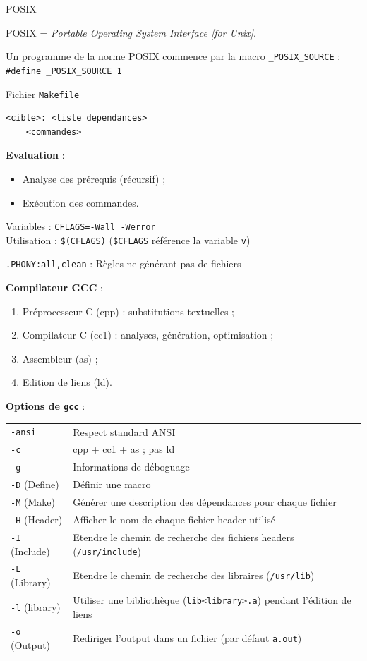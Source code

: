 \documentclass[french]{scrartcl}
\begin{document}
\begin{multicols}{3}
{\Large POSIX}

\vskip 15pt
POSIX = \emph{Portable Operating System Interface [for Unix]}.

Un programme de la norme POSIX commence par la macro \lstinline!_POSIX_SOURCE! : \lstinline!#define _POSIX_SOURCE 1!


\vskip 10pt
Fichier \lstinline!Makefile!
\vspace{-7pt}\begin{lstlisting}
<cible>: <liste dependances>
	<commandes>
\end{lstlisting}\vspace{-7pt}
\textbf{Evaluation} :\begin{itemize}
	\item Analyse des prérequis (récursif) ;
	\item Exécution des commandes.
\end{itemize}
Variables : \lstinline!CFLAGS=-Wall -Werror!\\
Utilisation : \lstinline!$(CFLAGS)! (\lstinline!$CFLAGS! référence la variable \lstinline!v!)

\lstinline!.PHONY:all,clean! : Règles ne générant pas de fichiers

\textbf{Compilateur GCC} :\begin{enumerate}
	\item Préprocesseur C (cpp) : substitutions textuelles ;
	\item Compilateur C (cc1) : analyses, génération, optimisation ;
	\item Assembleur (as) ;
	\item Edition de liens (ld).
\end{enumerate}  

\textbf{Options de \lstinline!gcc!} :

\begin{tabularx}{\linewidth}{lX}
\lstinline!-ansi! & Respect standard ANSI\\
\lstinline!-c! & cpp + cc1 + as ; pas ld\\
\lstinline!-g! & Informations de déboguage\\
\lstinline!-D! (Define) & Définir une macro\\
\lstinline!-M! (Make) & Générer une description des dépendances pour chaque fichier\\
\lstinline!-H! (Header) & Afficher le nom de chaque fichier header utilisé\\
\lstinline!-I! (Include) & Etendre le chemin de recherche des fichiers headers (\lstinline!/usr/include!)\\
\lstinline!-L! (Library) & Etendre le chemin de recherche des libraires (\lstinline!/usr/lib!)\\
\lstinline!-l! (library) & Utiliser une bibliothèque (\lstinline!lib<library>.a!) pendant l'édition de liens\\
\lstinline!-o! (Output) & Rediriger l'output dans un fichier (par défaut \lstinline!a.out!)
\end{tabularx}


\end{multicols}
\end{document}
